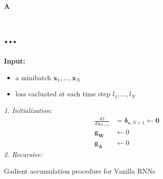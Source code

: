 \documentclass{article}
\title{}
\author{
  Yongqiang Wang\\
  \texttt{yongqiang.wang@outlook.com} \\
}
\newcommand{\bs}[1]{\boldsymbol{#1}}
\begin{document}
\maketitle
$\bs A$

\section{...}

\begin{algorithm}
  \textbf{Input:} 
  \begin{itemize}
    \item a minibatch $\bs x_1, \dots, \bs x_N$ 
    \item loss cacluated at each time step $l_1,\dots, l_N$
  \end{itemize}
  \textit{1. Initialization:}
  \begin{align*}
        \frac{d\,l}{d\,\bs s_{N+1}} &=\bs \delta_{\bs s, N+1} \leftarrow \bs 0\\
        \bs g_{\mathbf W} &\leftarrow 0 \\
        \bs g_{\mathbf A} &\leftarrow 0 
  \end{align*}
  \textit{2. Recursive:}\\
  \caption{Gadient accumulation procedure for Vanilla RNNs}
\end{algorithm}



%
%
\end{document}
